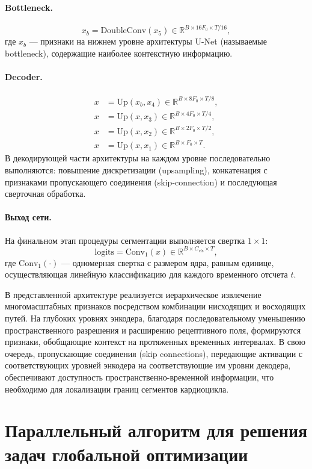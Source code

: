 \documentclass[11pt, oneside, a4paper]{article}
\begin{document}
\paragraph{Bottleneck.}
\[
x_b = \text{DoubleConv}(x_5) \in \mathbb{R}^{B \times 16F_0 \times T/16},
\]
где $x_b$ --- признаки на нижнем уровне архитектуры U-Net (называемые bottleneck), содержащие наиболее контекстную информацию.

\paragraph{Decoder.}
\begin{align*}
x &= \text{Up}(x_b, x_4) \in \mathbb{R}^{B \times 8F_0 \times T/8},\\
x &= \text{Up}(x, x_3) \in \mathbb{R}^{B \times 4F_0 \times T/4},\\
x &= \text{Up}(x, x_2) \in \mathbb{R}^{B \times 2F_0 \times T/2},\\
x &= \text{Up}(x, x_1) \in \mathbb{R}^{B \times F_0 \times T}.
\end{align*}
В декодирующей части архитектуры на каждом уровне последовательно выполняются: повышение дискретизации (upsampling), конкатенация с признаками пропускающего соединения (skip-connection) и последующая сверточная обработка.

\paragraph{Выход сети.}
На финальном этап процедуры сегментации выполняется свертка $1\times1$:
\[
\text{logits} = \text{Conv}_{1}(x) \in \mathbb{R}^{B \times C_{\text{cls}} \times T},
\]
где $\text{Conv}_{1}(\cdot)$ --- одномерная свертка с размером ядра, равным единице, осуществляющая линейную классификацию для каждого временного отсчета $t$.

В представленной архитектуре реализуется иерархическое извлечение многомасштабных признаков посредством комбинации нисходящих и восходящих путей. На глубоких уровнях энкодера, благодаря последовательному уменьшению пространственного разрешения и расширению рецептивного поля, формируются признаки, обобщающие контекст на протяженных временных интервалах. В свою очередь, пропускающие соединения (skip connections), передающие активации с соответствующих уровней энкодера на соответствующие им уровни декодера, обеспечивают доступность пространственно-временной информации, что необходимо для локализации границ сегментов кардиоцикла.


\section{Параллельный алгоритм для решения задач глобальной оптимизации} \label{sec-PGSA}
\end{document}
